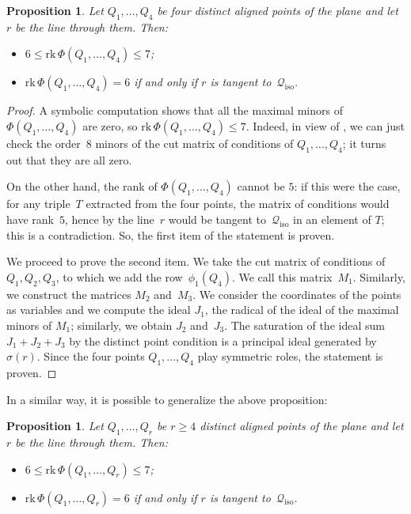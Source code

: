 \documentclass{amsart}
\theoremstyle{plain}
\newtheorem{prop}[lemma]{Proposition}
\theoremstyle{definition}
\newcommand{\iso}{\mathcal{Q}_{\mathrm{iso}}}
\newcommand{\rk}{\ensuremath{\mathrm{rk}}}
\begin{document}
\begin{prop}
\label{proposition:four_aligned}
Let $Q_1, \dotsc, Q_4$ be four distinct aligned points of the plane and
let $r$ be the line through them. Then:
%
\begin{itemize}
  \item $6 \leq \rk \,\Phi(Q_1, \dotsc, Q_4) \leq 7$;
  \item $\rk \,\Phi(Q_1, \dotsc, Q_4) = 6$ if and only if $r$ is tangent to~$\iso$.
\end{itemize}
%
\end{prop}
\begin{proof}
A symbolic computation shows that all the maximal minors of~$\Phi(Q_1, \dotsc, Q_4)$ are zero, so
\mbox{$\rk \, \Phi(Q_1, \dotsc, Q_4) \leq 7$}.
Indeed, in view of , we can just check the order~$8$ minors of the cut matrix of conditions of $Q_1, \dotsc, Q_4$;
it turns out that they are all zero.

On the other hand, the rank of $\Phi(Q_1, \dotsc, Q_4)$ cannot be $5$:
if this were the case, for any triple~$T$ extracted from the four points, the matrix of conditions would have rank~$5$, hence by  the line~$r$ would be tangent to~$\iso$ in an element of $T$; this is a contradiction.
So, the first item of the statement is proven.

We proceed to prove the second item.
We take the cut matrix of conditions of~$Q_1, Q_2, Q_3$, to which we add the row~$\phi_1(Q_4)$.
We call this matrix~$M_1$.
Similarly, we construct the matrices $M_2$ and~$M_3$.
We consider the coordinates of the points as variables and we compute
the ideal $J_1$, the radical of the ideal of the maximal minors of $M_1$; similarly, we obtain $J_2$ and~$J_3$.
The saturation of the ideal sum $J_1 + J_2 + J_3$ by the distinct point condition is a principal ideal generated by~$\sigma(r)$.
Since the four points $Q_1, \dotsc, Q_4$ play symmetric roles, the statement is proven.
\end{proof}

In a similar way, it is possible to generalize the above proposition:
\begin{prop}
\label{proposition:n_aligned}
Let $Q_1, \dotsc, Q_r$ be $r\geq 4$ distinct aligned points of the plane and
let $r$ be the line through them. Then:
%
\begin{itemize}
  \item $6 \leq \rk \,\Phi(Q_1, \dotsc, Q_r) \leq 7$;
  \item $\rk \,\Phi(Q_1, \dotsc, Q_r) = 6$ if and only if $r$ is tangent to~$\iso$.
\end{itemize}
%
\end{prop}
\end{document}
